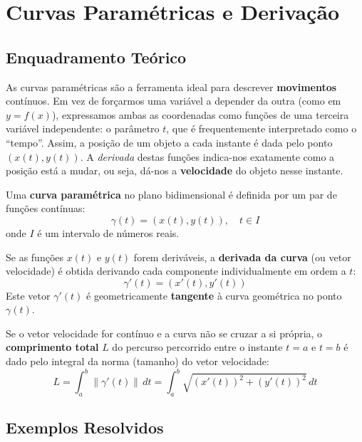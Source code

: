 \section{Curvas Paramétricas e Derivação}

\subsection{Enquadramento Teórico}

\begin{notebox}[title={Intuição Geral}]
  As curvas paramétricas são a ferramenta ideal para descrever \textbf{movimentos} contínuos. Em vez de forçarmos uma variável a depender da outra (como em $y = f(x)$), expressamos ambas as coordenadas como funções de uma terceira variável independente: o parâmetro $t$, que é frequentemente interpretado como o ``tempo''.
  Assim, a posição de um objeto a cada instante é dada pelo ponto $(x(t), y(t))$. A \emph{derivada} destas funções indica-nos exatamente como a posição está a mudar, ou seja, dá-nos a \textbf{velocidade} do objeto nesse instante.
\end{notebox}

\begin{defbox}[title={Curva Paramétrica e Vetor Velocidade}]
  Uma \textbf{curva paramétrica} no plano bidimensional é definida por um par de funções contínuas:
  \[
    \gamma(t) = (x(t), y(t)), \quad t \in I
  \]
  onde $I$ é um intervalo de números reais.
  
  Se as funções $x(t)$ e $y(t)$ forem deriváveis, a \textbf{derivada da curva} (ou vetor velocidade) é obtida derivando cada componente individualmente em ordem a $t$:
  \[
    \gamma'(t) = (x'(t), y'(t))
  \]
  Este vetor $\gamma'(t)$ é geometricamente \textbf{tangente} à curva geométrica no ponto $\gamma(t)$.
\end{defbox}

\begin{defbox}[title={Comprimento de uma Curva (Arco)}]
  Se o vetor velocidade for contínuo e a curva não se cruzar a si própria, o \textbf{comprimento total} $L$ do percurso percorrido entre o instante $t=a$ e $t=b$ é dado pelo integral da norma (tamanho) do vetor velocidade:
  \[
    L = \int_a^b \|\gamma'(t)\| \,dt = \int_a^b \sqrt{(x'(t))^2 + (y'(t))^2} \,dt
  \]
\end{defbox}

\subsection{Exemplos Resolvidos}


